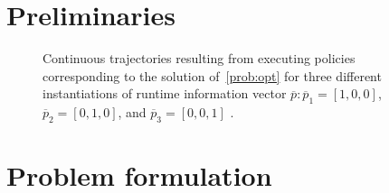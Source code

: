 
\section{Preliminaries}\label{sec_prel}

\begin{figure}[t!]
\centering
    \caption{Continuous trajectories resulting from executing policies corresponding to the solution of~\eqref{prob:opt} for three different instantiations of runtime information vector $\overline{p} \colon \overline{p}_1 = [1,0,0]$, $\overline{p}_2 = [0,1,0]$, and $\overline{p}_3 = [0,0,1]$ .}\label{fig:trivialtrajs}
\end{figure}




\section{Problem formulation}\label{sec:prob}

